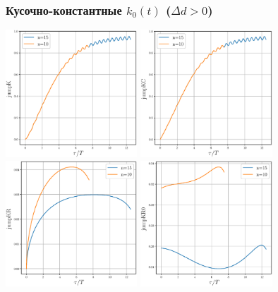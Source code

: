 \documentclass{beamer}
\begin{document}
\begin{frame}
\frametitle{Кусочно-константные $k_0(t)$ ($\Delta d >0$)}
\phantom{123}   
\begin{center}
	\includegraphics[width=0.37\textwidth]{2206_k-10-15.eps} %
	\includegraphics[width=0.37\textwidth]{2206_kC-10-15.eps}
	\vfill
	\includegraphics[width=0.37\textwidth]{2206_kR-10-15.eps} %
	\includegraphics[width=0.37\textwidth]{2206_kR0-10-15.eps}
\end{center}
\end{frame}
\end{document}
